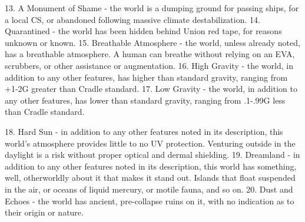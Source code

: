     13. A Monument of Shame - the world is a dumping ground for passing ships, for a local CS,
        or abandoned following massive climate destabilization.
    14. Quarantined - the world has been hidden behind Union red tape, for reasons unknown or
        known.
    15. Breathable Atmosphere - the world, unless already noted, has a breathable atmosphere. A
        human can breathe without relying on an EVA, scrubbers, or other assistance or
        augmentation.
    16. High Gravity - the world, in addition to any other features, has higher than standard gravity,
        ranging from +1-2G greater than Cradle standard.
    17. Low Gravity - the world, in addition to any other features, has lower than standard gravity,
        ranging from .1-.99G less than Cradle standard.




    18. Hard Sun - in addition to any other features noted in its description, this world’s
        atmosphere provides little to no UV protection. Venturing outside in the daylight is a risk
        without proper optical and dermal shielding.
    19. Dreamland - in addition to any other features noted in its description, this world has
        something, well, otherworldly about it that makes it stand out. Islands that float suspended
        in the air, or oceans of liquid mercury, or motile fauna, and so on.
    20. Dust and Echoes - the world has ancient, pre-collapse ruins on it, with no indication as to
        their origin or nature.

